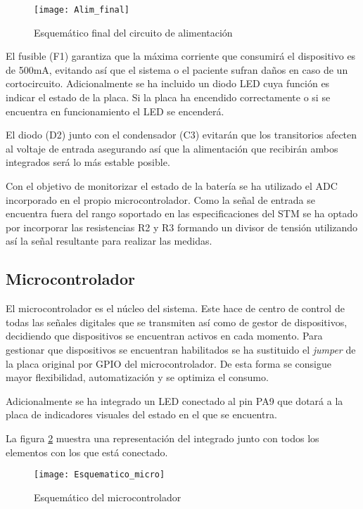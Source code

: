 \begin{figure} [h]
    \centering
    \texttt{[image: Alim\_final]}
    \caption{Esquemático final del circuito de alimentación}
    \label{fig:Alim_final}
\end{figure}

El fusible (F1) garantiza que la máxima corriente que consumirá el dispositivo es de 500mA, evitando así que el sistema o el paciente sufran daños en caso de un cortocircuito. Adicionalmente se ha incluido un diodo \acrshort{LED} cuya función es indicar el estado de la placa. Si la placa ha encendido correctamente o si se encuentra en funcionamiento el \acrshort{LED} se encenderá.

El diodo (D2) junto con el condensador (C3) evitarán que los transitorios afecten al voltaje de entrada asegurando así que la alimentación que recibirán ambos integrados será lo más estable posible.

Con el objetivo de monitorizar el estado de la batería se ha utilizado el \acrshort{ADC} incorporado en el propio microcontrolador. Como la señal de entrada se encuentra fuera del rango soportado en las especificaciones del STM se ha optado por incorporar las resistencias R2 y R3 formando un divisor de tensión utilizando así la señal resultante para realizar las medidas.

\clearpage

\subsection{Microcontrolador\label{sec:Esquemáticos_micro}}

El microcontrolador es el núcleo del sistema. Este hace de centro de control de todas las señales digitales que se transmiten así como de gestor de dispositivos, decidiendo que dispositivos se encuentran activos en cada momento. 
Para gestionar que dispositivos se encuentran habilitados se ha sustituido el \textit{jumper} de la placa original por \acrshort{GPIO} del microcontrolador. De esta forma se consigue mayor flexibilidad, automatización y se optimiza el consumo. 

Adicionalmente se ha integrado un \acrshort{LED} conectado al pin PA9 que dotará a la placa de indicadores visuales del estado en el que se encuentra.

La figura \ref{fig:Esquematico_micro} muestra una representación del integrado junto con todos los elementos con los que está conectado.

\begin{figure} [h]
    \centering
    \texttt{[image: Esquematico\_micro]}
    \caption{Esquemático del microcontrolador}
    \label{fig:Esquematico_micro}
\end{figure}

